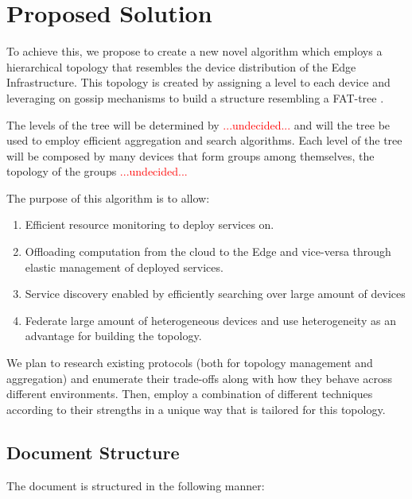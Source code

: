 \chapter{Proposed Solution}
\label{cha:proposed_sol}


To achieve this, we propose to create a new novel algorithm which employs a hierarchical topology that resembles the device distribution of the Edge Infrastructure. This topology is created by assigning a level to each device and leveraging on gossip mechanisms to build a structure resembling a FAT-tree \cite{}.

The levels of the tree will be determined by \textcolor{red}{...undecided...} and will the tree be used to employ efficient aggregation and search algorithms. Each level of the tree will be composed by many devices that form groups among themselves, the topology of the groups \textcolor{red}{...undecided...} 

The purpose of this algorithm is to allow:

\begin{enumerate} 
    \item Efficient resource monitoring to deploy services on.
    \item Offloading computation from the cloud to the Edge and vice-versa through elastic management of deployed services.
    \item Service discovery enabled by efficiently searching over large amount of devices
    \item Federate large amount of heterogeneous devices and use heterogeneity as an advantage for building the topology.
\end{enumerate}

We plan to research existing protocols (both for topology management and aggregation) and enumerate their trade-offs along with how they behave across different environments. Then, employ a combination of different techniques according to their strengths in a unique way that is tailored for this topology.

\section{Document Structure}

The document is structured in the following manner:

